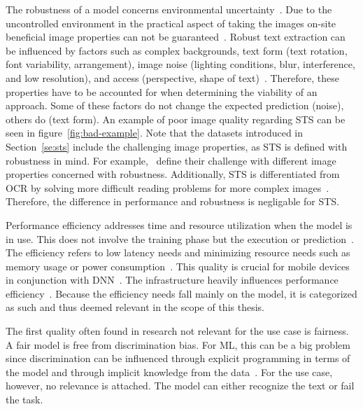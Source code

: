 The robustness of a model concerns environmental uncertainty~\citep{ashmore_assuring_2021}.
Due to the uncontrolled environment in the practical aspect of taking the images on-site
beneficial image properties can not be guaranteed~\citep{chen_text_2021}.
Robust text extraction can be influenced by factors such as complex backgrounds, text form
(text rotation, font variability, arrangement), image noise (lighting conditions, blur,
interference, and low resolution), and access (perspective, shape of
text)~\citep{oyedotun_deep_2015,ghosh_visual_2017,chen_text_2021}.
Therefore, these properties have to be accounted for when determining the viability of an approach.
Some of these factors do not change the expected prediction (noise), others do (text
form)\cite{hu_towards_2020}.
An example of poor image quality regarding \ac{STS} can be seen in figure~\ref{fig:bad-example}.
Note that the datasets introduced in Section~\ref{se:sts} include the challenging image properties,
as \ac{STS} is defined with robustness in mind.
For example,~\cite{karatzas_icdar_2013,karatzas_icdar_2015,chng_total-text_2017} define their
challenge with different image properties concerned with robustness.
Additionally, \ac{STS} is differentiated from \ac{OCR} by solving more difficult reading problems
for more complex images~\citep{long_scene_2021,hu_gtc_2020,chen_text_2021,baek_what_2019}.
Therefore, the difference in performance and robustness is negligable for \ac{STS}.

Performance efficiency addresses time and resource utilization when the model is in use.
This does not involve the training phase but the execution or
prediction~\citep{siebert_construction_2021}.
The efficiency refers to low latency needs and minimizing resource needs such as memory
usage or power consumption~\citep{nakamichi_requirements-driven_2020, siebert_construction_2021,
sourvanos_challenges_2018}.
This quality is crucial for mobile devices in conjunction with
\ac{DNN}~\citep{sourvanos_challenges_2018, niu_26ms_2019}.
The infrastructure heavily influences performance
efficiency~\citep{nakamichi_requirements-driven_2020, siebert_construction_2021}.
Because the efficiency needs fall mainly on the model, it is categorized as such and thus deemed
relevant in the scope of this thesis.

The first quality often found in research not relevant for the use case is fairness.
A fair model is free from discrimination bias.
For \ac{ML}, this can be a big problem since discrimination can be influenced through
explicit programming in terms of the model and through implicit knowledge from the
data~\citep{vogelsang_requirements_2019}.
For the use case, however, no relevance is attached.
The model can either recognize the text or fail the task.

